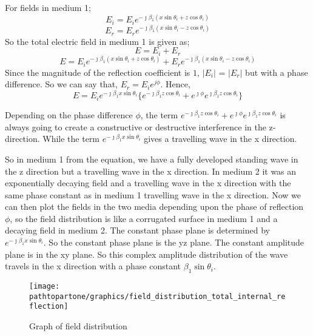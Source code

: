 For fields in medium 1;
\begin{equation}
E_i = E_i e^{- \jmath \beta_1(x\sin\theta_i + z\cos\theta_i)}
\end{equation}
\begin{equation}
E_r = E_r e^{- \jmath \beta_1(x\sin\theta_i - z\cos\theta_i)}
\end{equation}
So the total electric field in medium 1 is given as;
\begin{equation*}
E = E_i + E_r
\end{equation*}
\begin{equation*}
E =  E_i e^{- \jmath \beta_1(x\sin\theta_i + z\cos\theta_i)} + E_r e^{- \jmath \beta_1(x\sin\theta_i - z\cos\theta_i)}
\end{equation*}
Since the magnitude of the reflection coefficient is $1$,  $|E_{i}|$ = $|E_{r}|$ but with a phase difference. So we can say that, $E_{r} = E_{i}e^{j\phi}$.
Hence,
\begin{equation*}
E = E_i e^{- \jmath \beta_1x\sin\theta_i}\{ e^{- \jmath \beta_1z\cos\theta_i} + e^{\jmath \phi}
e^{\jmath \beta_1 z\cos\theta_i} \}
\end{equation*}

Depending on the phase difference $\phi$, the term $e^{- \jmath \beta_1z\cos\theta_i} + e^{\jmath \phi}
e^{\jmath \beta_1 z\cos\theta_i}$ is always going to create a constructive or destructive interference in the z-direction. While the term $ e^{- \jmath \beta_1x\sin\theta_i}$ gives a travelling wave in the x direction.

So in medium 1 from the equation, we have a fully developed standing wave in the z direction but a travelling wave in the x direction. In medium 2 it was an exponentially decaying field and a travelling wave in the x direction with the same phase constant as in medium 1 travelling wave in the x direction. Now we can then plot the fields in the two media depending upon the phase of reflection $\phi$, so the field distribution is like a corrugated surface in medium 1 and a decaying field in medium 2. The constant phase plane is determined by $e^{- \jmath \beta_{1}x\sin\theta_i}$. So the constant phase plane is the yz plane. The constant amplitude plane is in the xy plane. So this complex amplitude distribution of the wave travels in the x direction with a phase constant $\beta_1\sin\theta_i$.
\begin{figure}[h]
\centering
\texttt{[image: \\pathtopartone/graphics/field\_distribution\_total\_internal\_reflection]}
\caption{Graph of field distribution}
\end{figure}

